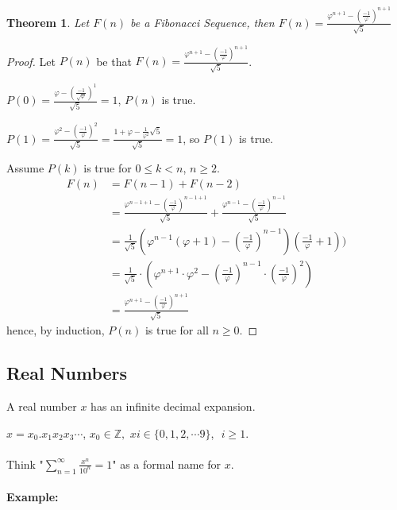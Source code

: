 \documentclass[12pt]{article}
\theoremstyle{plain}
\newtheorem{theorem}{Theorem}[subsection]
\renewcommand{\phi}{\varphi}
\begin{document}
        \begin{theorem}
            Let $F(n)$ be a Fibonacci Sequence, 
            then $F(n) = \frac{\phi^{n+1} -(\frac{-1}{\phi})^{n+1}}{\sqrt 5}$
        \end{theorem}
        \begin{proof}
            Let $P(n)$ be that 
						$F(n) = \frac{\phi^{n+1} -(\frac{-1}{\phi})^{n+1}}{\sqrt 5}$.

            $P(0) = \frac{\phi - (\frac{-1}{\sqrt \phi})^1}{\sqrt 5} = 1$, 
            $P(n)$ is true.

            $P(1) = \frac{\phi ^2 -(\frac{-1}{\phi})^2}{\sqrt 5} = 
            \frac{1+\phi-\frac1{\phi^2}{\sqrt 5}}{\sqrt 5}=1$, 
            so $P(1)$ is true.

            Assume $P(k)$ is true for $0\leq k < n$, $n\geq 2$. 
            \begin{align*}
                F(n)&= F(n-1)+F(n-2)\\
                    &= \frac{\phi ^{n-1+1} -(\frac{-1}{\phi})^{n-1+1}}{\sqrt 5}
                    + \frac{\phi ^{n-1}-(\frac{-1}{\phi})^{n-1}}{\sqrt 5}\\
                    &=\frac1{\sqrt 5} (\phi^{n-1} (\phi +1) - 
                    (\frac{-1}{\phi})^{n-1})(\frac{-1}{\phi}+1))\\
                    &=\frac1{\sqrt 5}\cdot (\phi^{n+1} \cdot\phi ^2 - 
                    (\frac{-1}{\phi})^{n-1}\cdot (\frac{-1}{\phi}) ^ 2)\\
                    &=\frac{\phi^{n+1} - (\frac{-1}{\phi})^{n+1}}{\sqrt 5}
            \end{align*}
            hence, by induction, $P(n)$ is true for all $n\geq 0$.
        \end{proof}
   


    \subsection{Real Numbers}
    A real number $x$ has an infinite decimal expansion. 

    $x = x_0.x_1 x_2x_3 \cdots$, 
    $x_0\in \mathbb{Z}, \,\,x{i}\in\{0 , 1 , 2, \cdots 9\}$,\,\, $i \geq 1$.\\\\
    Think "$\sum_{n=1}^{\infty} \frac{x^n}{10^n} = 1$" as a formal name for $x$.\\\\
    \textbf{Example:}
\end{document}
